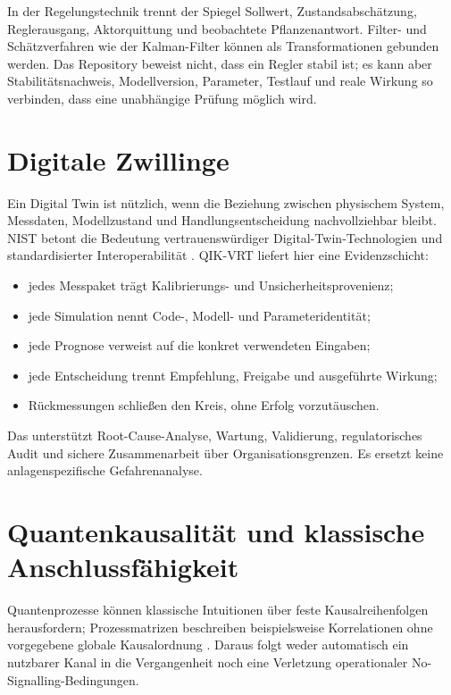 \documentclass[11pt,a4paper,oneside]{article}
\begin{document}
In der Regelungstechnik trennt der Spiegel Sollwert, Zustandsabschätzung,
Reglerausgang, Aktorquittung und beobachtete Pflanzenantwort. Filter- und
Schätzverfahren wie der Kalman-Filter \cite{Kalman1960} können als
Transformationen gebunden werden. Das Repository beweist nicht, dass ein
Regler stabil ist; es kann aber Stabilitätsnachweis, Modellversion, Parameter,
Testlauf und reale Wirkung so verbinden, dass eine unabhängige Prüfung möglich
wird.

\section{Digitale Zwillinge}

Ein Digital Twin ist nützlich, wenn die Beziehung zwischen physischem System,
Messdaten, Modellzustand und Handlungsentscheidung nachvollziehbar bleibt.
NIST betont die Bedeutung vertrauenswürdiger Digital-Twin-Technologien und
standardisierter Interoperabilität \cite{NISTDigitalTwins}. QIK-VRT liefert
hier eine Evidenzschicht:

\begin{itemize}
  \item jedes Messpaket trägt Kalibrierungs- und Unsicherheitsprovenienz;
  \item jede Simulation nennt Code-, Modell- und Parameteridentität;
  \item jede Prognose verweist auf die konkret verwendeten Eingaben;
  \item jede Entscheidung trennt Empfehlung, Freigabe und ausgeführte Wirkung;
  \item Rückmessungen schließen den Kreis, ohne Erfolg vorzutäuschen.
\end{itemize}

Das unterstützt Root-Cause-Analyse, Wartung, Validierung, regulatorisches
Audit und sichere Zusammenarbeit über Organisationsgrenzen. Es ersetzt keine
anlagenspezifische Gefahrenanalyse.

\section{Quantenkausalität und klassische Anschlussfähigkeit}

Quantenprozesse können klassische Intuitionen über feste Kausalreihenfolgen
herausfordern; Prozessmatrizen beschreiben beispielsweise Korrelationen ohne
vorgegebene globale Kausalordnung \cite{Oreshkov2012}. Daraus folgt weder
automatisch ein nutzbarer Kanal in die Vergangenheit noch eine Verletzung
operationaler No-Signalling-Bedingungen.
\end{document}
